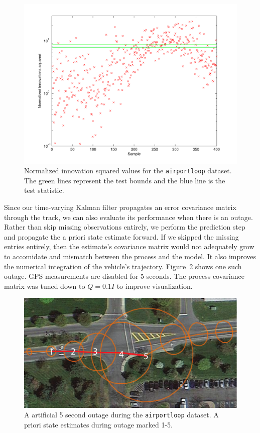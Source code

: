 \begin{figure}[!b]
\includegraphics[width=\columnwidth]{nis}
\caption{Normalized innovation squared values for the \texttt{airportloop} dataset.  The green lines represent the test bounds and the blue line is the test statistic.}
\label{fig:nis}
\end{figure}

Since our time-varying Kalman filter propagates an error covariance matrix through the track, we can also evaluate its performance when there is an outage.  Rather than skip missing observations entirely, we perform the prediction step and propagate the a priori state estimate forward.  If we skipped the missing entries entirely, then the estimate's covariance matrix would not adequately grow to accomidate and mismatch between the process and the model.  It also improves the numerical integration of the vehicle's trajectory.  Figure~\ref{fig:outage} shows one such outage.  GPS measurements are disabled for 5 seconds.  The process covariance matrix was tuned down to $Q = 0.1I$ to improve visualization.

\begin{figure}[!b]
\includegraphics[width=\columnwidth]{outage}
\caption{A artificial 5 second outage during the \texttt{airportloop} dataset.  A priori state estimates during outage marked 1-5.}
\label{fig:outage}
\end{figure}


